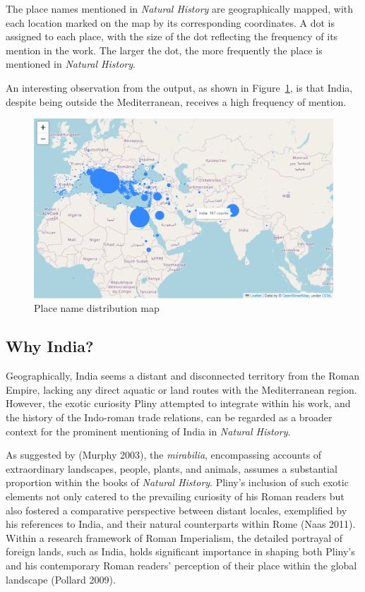 \documentclass[
  12pt,
]{article}
\begin{document}
The place names mentioned in \emph{Natural History} are geographically
mapped, with each location marked on the map by its corresponding
coordinates. A dot is assigned to each place, with the size of the dot
reflecting the frequency of its mention in the work. The larger the dot,
the more frequently the place is mentioned in \emph{Natural History}.

An interesting observation from the output, as shown in
Figure~\ref{fig-geonamemap_pdf}, is that India, despite being outside
the Mediterranean, receives a high frequency of mention.

\begin{figure}

{\centering \includegraphics{NHthesis_structure_files/figure-pdf/fig-geonamemap_pdf-output-1.png}

}

\caption{\label{fig-geonamemap_pdf}Place name distribution map}

\end{figure}

\hypertarget{why-india}{%
\subsection{Why India?}\label{why-india}}

Geographically, India seems a distant and disconnected territory from
the Roman Empire, lacking any direct aquatic or land routes with the
Mediterranean region. However, the exotic curiosity Pliny attempted to
integrate within his work, and the history of the Indo-roman trade
relations, can be regarded as a broader context for the prominent
mentioning of India in \emph{Natural History}.

As suggested by (Murphy 2003), the \emph{mirabilia}, encompassing
accounts of extraordinary landscapes, people, plants, and animals,
assumes a substantial proportion within the books of \emph{Natural
History}. Pliny's inclusion of such exotic elements not only catered to
the prevailing curiosity of his Roman readers but also fostered a
comparative perspective between distant locales, exemplified by his
references to India, and their natural counterparts within Rome (Naas
2011). Within a research framework of Roman Imperialism, the detailed
portrayal of foreign lands, such as India, holds significant importance
in shaping both Pliny's and his contemporary Roman readers' perception
of their place within the global landscape (Pollard 2009).
\end{document}
